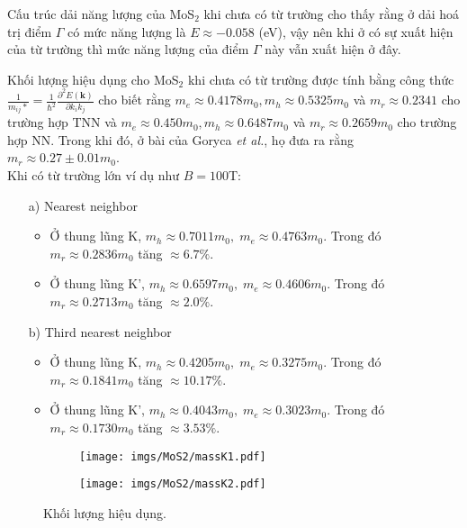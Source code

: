 \documentclass{article}
\begin{document}
Cấu trúc dải năng lượng của MoS$_{2}$ khi chưa có từ trường cho thấy rằng ở dải hoá trị điểm $\Gamma$ có mức năng lượng là $E \approx -0.058$ (eV), vậy nên khi ở có sự xuất hiện của từ trường thì mức năng lượng của điểm $\Gamma$ này vẫn xuất hiện ở đây. 

Khối lượng hiệu dụng cho MoS$_{2}$ khi chưa có từ trường được tính bằng công thức $\frac{1}{m_{ij}*} =\frac{1}{\hbar^{2}} \frac{\partial^{2} E(\mathbf{k})}{\partial k_{i} k_{j}}$ cho biết rằng $m_{e} \approx 0.4178 m_{0}, m_{h} \approx 0.5325 m_{0}$ và $m_{r} \approx 0.2341$ cho trường hợp TNN và $m_{e} \approx 0.450 m_{0}, m_{h} \approx 0.6487 m_{0}$ và $m_{r} \approx 0.2659m_{0}$ cho trường hợp NN. Trong khi đó, ở bài của Goryca \textit{et al.}\cite{goryca2019}, họ đưa ra rằng $m_{r} \approx 0.27 \pm 0.01 m_{0}$.\\
Khi có từ trường lớn ví dụ như $B = 100 $T:
\begin{itemize}
	\item[a)] Nearest neighbor
	\begin{itemize}
		\item Ở thung lũng K, $m_{h} \approx 0.7011 m_{0},\; m_{e} \approx 0.4763 m_{0}$. 
		Trong đó $m_{r} \approx 0.2836 m_{0}$ tăng $\approx 6.7\%$.
		
		\item Ở thung lũng K', $m_{h} \approx 0.6597 m_{0},\; m_{e} \approx 0.4606 m_{0}$. 
		Trong đó $m_{r} \approx 0.2713 m_{0}$ tăng $\approx 2.0\%$.
	\end{itemize}
	\item[b)] Third nearest neighbor
	\begin{itemize}
		\item Ở thung lũng K, $m_{h} \approx 0.4205 m_{0},\; m_{e} \approx 0.3275 m_{0}$. 
		Trong đó $m_{r} \approx 0.1841 m_{0}$ tăng $\approx 10.17\%$.
		
		\item Ở thung lũng K', $m_{h} \approx 0.4043 m_{0},\; m_{e} \approx 0.3023 m_{0}$. 
		Trong đó $m_{r} \approx 0.1730 m_{0}$ tăng $\approx 3.53\%$.
	\end{itemize}
\end{itemize}

\begin{figure}[htb]
	\begin{subfigure}{0.495\textwidth}
		\centering
		\texttt{[image: imgs/MoS2/massK1.pdf]}
	\end{subfigure}
	\begin{subfigure}{0.495\textwidth}
		\centering
		\texttt{[image: imgs/MoS2/massK2.pdf]}
	\end{subfigure}
	\caption{Khối lượng hiệu dụng.}
\end{figure}
\newpage
\end{document}
